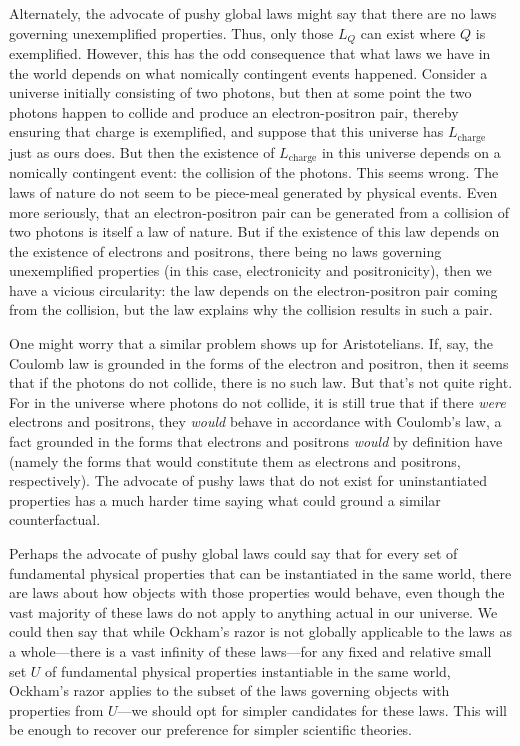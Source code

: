 Alternately, the advocate of pushy global laws might say that there are no laws governing unexemplified properties. 
Thus, only those $L_Q$ can exist where $Q$ is exemplified. However, this has the odd consequence that what laws we 
have in the world depends on what nomically contingent events happened. Consider a universe initially consisting of 
two photons, but then at some point the two photons happen to collide and produce an electron-positron pair, thereby
ensuring that charge is exemplified, and suppose that this universe has $L_{\text{charge}}$ just as ours does. But 
then the existence of $L_{\text{charge}}$ in this universe depends on a nomically contingent event: the collision of 
the photons. This seems wrong. The laws of nature do not seem to be piece-meal generated by physical events. Even more 
seriously, that an electron-positron pair can be generated from a collision of two photons is itself a law of nature.
But if the existence of this law depends on the existence of electrons and positrons, there being no laws governing 
unexemplified properties (in this case, electronicity and positronicity), then we have a vicious circularity: the law
depends on the electron-positron pair coming from the collision, but the law explains why the collision results in such 
a pair.

One might worry that a similar problem shows up for Aristotelians. If, say, the Coulomb law is grounded in the forms of the electron
and positron, then it seems that if the photons do not collide, there is no such law. But that's not quite right. For 
in the universe 
where photons do not collide, it is still true that if there \textit{were} electrons and positrons, they \textit{would} 
behave in accordance with Coulomb's law, a fact grounded in the forms that electrons and positrons \textit{would} 
by definition have (namely the forms that would constitute them as electrons and positrons, respectively). The 
advocate of pushy laws that do not exist for uninstantiated properties has a much harder time saying what could 
ground a similar counterfactual.

Perhaps the advocate of pushy global laws could say that for every set of fundamental physical properties that can be 
instantiated in the same world, there are laws about how objects with those properties would behave, even though 
the vast majority of these laws do not apply to anything actual in our universe. We could then say that while Ockham's 
razor is not globally applicable to the laws as a whole---there is a vast infinity of these laws---for any fixed and 
relative small set $U$ of fundamental physical properties instantiable in the same world, Ockham's razor applies to 
the subset of the laws governing objects with properties from $U$---we should opt for simpler candidates for these 
laws. This will be enough to recover our preference for simpler scientific theories. 

